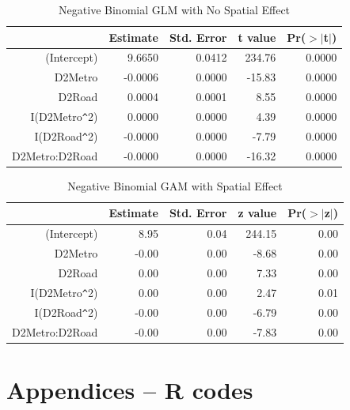 \documentclass[hidelinks,12pt]{article}
\begin{document}
	\begin{table}[!ht]
		\centering
		\caption{Negative Binomial GLM with No Spatial Effect} \label{tbl:nbglm}
		\begin{tabular}{rrrrr}
			\hline
			& Estimate & Std. Error & t value & Pr($>$$|$t$|$) \\ 
			\hline
			(Intercept) & 9.6650 & 0.0412 & 234.76 & 0.0000 \\ 
			D2Metro & -0.0006 & 0.0000 & -15.83 & 0.0000 \\ 
			D2Road & 0.0004 & 0.0001 & 8.55 & 0.0000 \\ 
			I(D2Metro\verb|^|2) & 0.0000 & 0.0000 & 4.39 & 0.0000 \\ 
			I(D2Road\verb|^|2) & -0.0000 & 0.0000 & -7.79 & 0.0000 \\ 
			D2Metro:D2Road & -0.0000 & 0.0000 & -16.32 & 0.0000 \\ 
			\hline
		\end{tabular}
	\end{table}
	\begin{table}[!ht]
		\centering
		\caption{Negative Binomial GAM with Spatial Effect} \label{tbl:nbgam}
		\begin{tabular}{rrrrr}
			\hline
			& Estimate & Std. Error & z value & Pr($>$$|$z$|$) \\ 
			\hline
			(Intercept) & 8.95 & 0.04 & 244.15 & 0.00 \\ 
			D2Metro & -0.00 & 0.00 & -8.68 & 0.00 \\ 
			D2Road & 0.00 & 0.00 & 7.33 & 0.00 \\ 
			I(D2Metro\verb|^|2) & 0.00 & 0.00 & 2.47 & 0.01 \\ 
			I(D2Road\verb|^|2) & -0.00 & 0.00 & -6.79 & 0.00 \\ 
			D2Metro:D2Road & -0.00 & 0.00 & -7.83 & 0.00 \\ 
			\hline
		\end{tabular}
	\end{table}


	\clearpage
	\section{Appendices -- R codes}
	\begin{verbatim}
		
	\end{verbatim}
	
\end{document}
